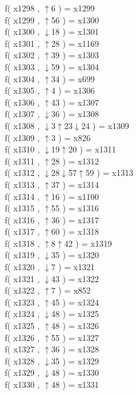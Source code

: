 f( x1298 , $\uparrow$6 ) = x1299 \\
f( x1299 , $\uparrow$56 ) = x1300 \\
f( x1300 , $\downarrow$18 ) = x1301 \\
f( x1301 , $\uparrow$28 ) = x1169 \\
f( x1302 , $\uparrow$39 ) = x1303 \\
f( x1303 , $\downarrow$59 ) = x1304 \\
f( x1304 , $\uparrow$34 ) = x699 \\
f( x1305 , $\uparrow$4 ) = x1306 \\
f( x1306 , $\uparrow$43 ) = x1307 \\
f( x1307 , $\downarrow$36 ) = x1308 \\
f( x1308 , $\downarrow$3$\uparrow$23$\downarrow$24 ) = x1309 \\
f( x1309 , $\uparrow$3 ) = x826 \\
f( x1310 , $\downarrow$19$\uparrow$20 ) = x1311 \\
f( x1311 , $\uparrow$28 ) = x1312 \\
f( x1312 , $\downarrow$28$\downarrow$57$\uparrow$59 ) = x1313 \\
f( x1313 , $\uparrow$37 ) = x1314 \\
f( x1314 , $\uparrow$16 ) = x1100 \\
f( x1315 , $\uparrow$55 ) = x1316 \\
f( x1316 , $\uparrow$36 ) = x1317 \\
f( x1317 , $\uparrow$60 ) = x1318 \\
f( x1318 , $\uparrow$8$\uparrow$42 ) = x1319 \\
f( x1319 , $\downarrow$35 ) = x1320 \\
f( x1320 , $\downarrow$7 ) = x1321 \\
f( x1321 , $\downarrow$43 ) = x1322 \\
f( x1322 , $\uparrow$7 ) = x852 \\
f( x1323 , $\uparrow$45 ) = x1324 \\
f( x1324 , $\downarrow$48 ) = x1325 \\
f( x1325 , $\uparrow$48 ) = x1326 \\
f( x1326 , $\uparrow$55 ) = x1327 \\
f( x1327 , $\uparrow$36 ) = x1328 \\
f( x1328 , $\downarrow$35 ) = x1329 \\
f( x1329 , $\downarrow$48 ) = x1330 \\
f( x1330 , $\uparrow$48 ) = x1331 \\
